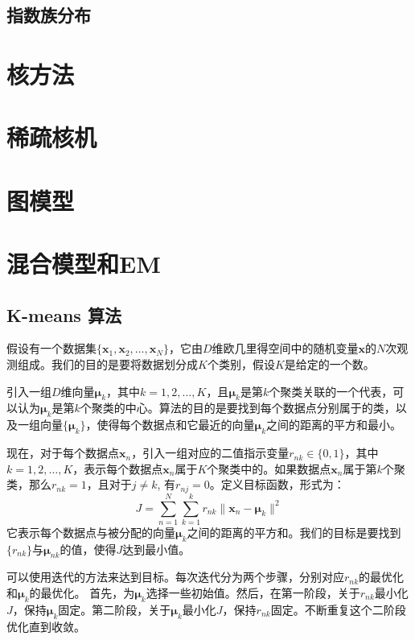 \documentclass[11pt]{ctexbook}
\begin{document}
\section{指数族分布}


\chapter{核方法}

\chapter{稀疏核机}

\chapter{图模型}

\chapter{混合模型和EM}
\section{K-means 算法}
假设有一个数据集$\{ \bm x_1, \bm x_2, \ldots, \bm x_N\}$，它由$D$维欧几里得空间中的随机变量$\bm x$的$N$次观测组成。我们的目的是要将数据划分成$K$个类别，假设$K$是给定的一个数。

引入一组$D$维向量$\bm \mu_k$，其中$k=1, 2, \ldots, K$，且$\bm \mu_k$是第$k$个聚类关联的一个代表，可以认为$\bm \mu_k$是第$k$个聚类的中心。算法的目的是要找到每个数据点分别属于的类，以及一组向量$\{\bm \mu_k\}$，使得每个数据点和它最近的向量$\bm \mu_k$之间的距离的平方和最小。

现在，对于每个数据点$\bm x_n$，引入一组对应的二值指示变量$r_{nk} \in \{0, 1\}$，其中 $k = 1, 2, \ldots, K$，表示每个数据点$\bm x_n$属于$K$个聚类中的。如果数据点$\bm x_n$属于第$k$个聚类，那么$r_{nk}=1$，且对于$j \neq k$, 有$r_{nj} = 0$。定义目标函数，形式为：
\begin{equation}
	\label{eq:kmeas-cost}
	J = \sum_{n=1}^{N}\sum_{k=1}^{k}r_{nk}\| \bm x_n - \bm \mu_k \|^2
\end{equation}
它表示每个数据点与被分配的向量$\bm \mu_k$之间的距离的平方和。我们的目标是要找到$\{r_{nk}\}$与$\bm \mu_{nk}$的值，使得$J$达到最小值。

可以使用迭代的方法来达到目标。每次迭代分为两个步骤，分别对应$r_{nk}$的最优化和$\bm \mu_k$的最优化。 首先，为$\bm \mu_k$选择一些初始值。然后，在第一阶段，关于$r_{nk}$最小化$J$，保持$\bm \mu_k$固定。第二阶段，关于$\bm \mu_k$最小化$J$，保持$r_{nk}$固定。不断重复这个二阶段优化直到收敛。
\end{document}
